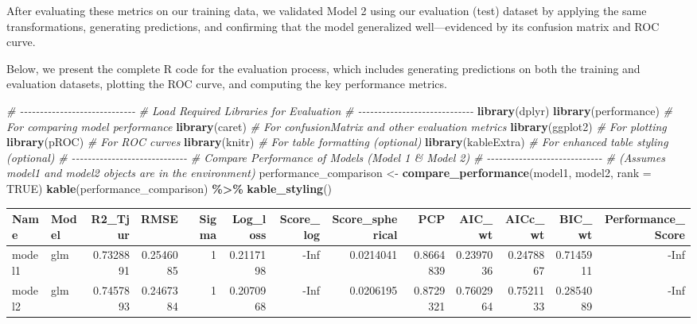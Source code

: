 \documentclass[
]{article}
\newenvironment{Shaded}{\begin{snugshade}}{\end{snugshade}}
\newcommand{\AttributeTok}[1]{\textcolor[rgb]{0.13,0.29,0.53}{#1}}
\newcommand{\CommentTok}[1]{\textcolor[rgb]{0.56,0.35,0.01}{\textit{#1}}}
\newcommand{\ConstantTok}[1]{\textcolor[rgb]{0.56,0.35,0.01}{#1}}
\newcommand{\FunctionTok}[1]{\textcolor[rgb]{0.13,0.29,0.53}{\textbf{#1}}}
\newcommand{\NormalTok}[1]{#1}
\newcommand{\OtherTok}[1]{\textcolor[rgb]{0.56,0.35,0.01}{#1}}
\newcommand{\SpecialCharTok}[1]{\textcolor[rgb]{0.81,0.36,0.00}{\textbf{#1}}}
\begin{document}
After evaluating these metrics on our training data, we validated Model
2 using our evaluation (test) dataset by applying the same
transformations, generating predictions, and confirming that the model
generalized well---evidenced by its confusion matrix and ROC curve.

Below, we present the complete R code for the evaluation process, which
includes generating predictions on both the training and evaluation
datasets, plotting the ROC curve, and computing the key performance
metrics.

\begin{Shaded}
\begin{Highlighting}[]
\CommentTok{\# {-}{-}{-}{-}{-}{-}{-}{-}{-}{-}{-}{-}{-}{-}{-}{-}{-}{-}{-}{-}{-}{-}{-}{-}{-}{-}{-}{-}{-}}
\CommentTok{\# Load Required Libraries for Evaluation}
\CommentTok{\# {-}{-}{-}{-}{-}{-}{-}{-}{-}{-}{-}{-}{-}{-}{-}{-}{-}{-}{-}{-}{-}{-}{-}{-}{-}{-}{-}{-}{-}}
\FunctionTok{library}\NormalTok{(dplyr)}
\FunctionTok{library}\NormalTok{(performance)   }\CommentTok{\# For comparing model performance}
\FunctionTok{library}\NormalTok{(caret)         }\CommentTok{\# For confusionMatrix and other evaluation metrics}
\FunctionTok{library}\NormalTok{(ggplot2)       }\CommentTok{\# For plotting}
\FunctionTok{library}\NormalTok{(pROC)          }\CommentTok{\# For ROC curves}
\FunctionTok{library}\NormalTok{(knitr)         }\CommentTok{\# For table formatting (optional)}
\FunctionTok{library}\NormalTok{(kableExtra)    }\CommentTok{\# For enhanced table styling (optional)}
\CommentTok{\# {-}{-}{-}{-}{-}{-}{-}{-}{-}{-}{-}{-}{-}{-}{-}{-}{-}{-}{-}{-}{-}{-}{-}{-}{-}{-}{-}{-}{-}}
\CommentTok{\# Compare Performance of Models (Model 1 \& Model 2)}
\CommentTok{\# {-}{-}{-}{-}{-}{-}{-}{-}{-}{-}{-}{-}{-}{-}{-}{-}{-}{-}{-}{-}{-}{-}{-}{-}{-}{-}{-}{-}{-}}
\CommentTok{\# (Assumes model1 and model2 objects are in the environment)}
\NormalTok{performance\_comparison }\OtherTok{\textless{}{-}} \FunctionTok{compare\_performance}\NormalTok{(model1, model2, }\AttributeTok{rank =} \ConstantTok{TRUE}\NormalTok{)}
\FunctionTok{kable}\NormalTok{(performance\_comparison) }\SpecialCharTok{\%\textgreater{}\%} \FunctionTok{kable\_styling}\NormalTok{()}
\end{Highlighting}
\end{Shaded}

\begin{longtable}[t]{llrrrrrrrrrrr}
\toprule
Name & Model & R2\_Tjur & RMSE & Sigma & Log\_loss & Score\_log & Score\_spherical & PCP & AIC\_wt & AICc\_wt & BIC\_wt & Performance\_Score\\
\midrule
model1 & glm & 0.7328891 & 0.2546085 & 1 & 0.2117198 & -Inf & 0.0214041 & 0.8664839 & 0.2397036 & 0.2478867 & 0.7145911 & -Inf\\
model2 & glm & 0.7457893 & 0.2467384 & 1 & 0.2070968 & -Inf & 0.0206195 & 0.8729321 & 0.7602964 & 0.7521133 & 0.2854089 & -Inf\\
\bottomrule
\end{longtable}
\end{document}
